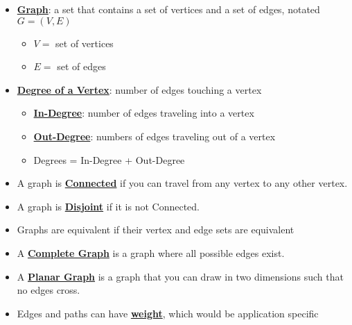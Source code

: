\documentclass[12pt]{article}
\newcommand{\definition}[1]{\underline{\textbf{#1}}}
\begin{document}
\begin{itemize}

    \item \definition{Graph}: a set that contains a set of vertices and a set of edges, notated $G = (V,E)$
    \begin{itemize}
        \item $V = $ set of vertices
        \item $E = $ set of edges
    \end{itemize}

    \item \definition{Degree of a Vertex}: number of edges touching a vertex
    \begin{itemize}
        \item \definition{In-Degree}: number of edges traveling into a vertex
        \item \definition{Out-Degree}: numbers of edges traveling out of a vertex
        \item Degrees = In-Degree + Out-Degree
    \end{itemize}

    \item A graph is \definition{Connected} if you can travel from any vertex to any other vertex.

    \item A graph is \definition{Disjoint} if it is not Connected.

    \item Graphs are equivalent if their vertex and edge sets are equivalent

    \item A \definition{Complete Graph} is a graph where all possible edges exist.

    \item A \definition{Planar Graph} is a graph that you can draw in two dimensions such that no edges cross.

    \item Edges and paths can have \definition{weight}, which would be application specific

\end{itemize}
\end{document}
